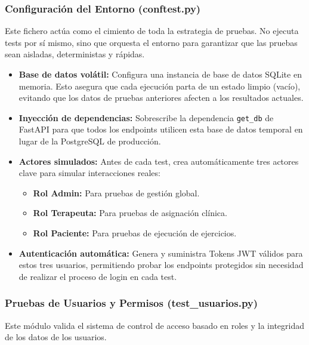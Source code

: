 \subsubsection{Configuración del Entorno (conftest.py)}
Este fichero actúa como el cimiento de toda la estrategia de pruebas. No ejecuta tests por sí mismo, sino que orquesta el entorno para garantizar que las pruebas sean aisladas, deterministas y rápidas.

\begin{itemize}
    \item \textbf{Base de datos volátil:} Configura una instancia de base de datos SQLite en memoria. Esto asegura que cada ejecución parta de un estado limpio (vacío), evitando que los datos de pruebas anteriores afecten a los resultados actuales.
    \item \textbf{Inyección de dependencias:} Sobrescribe la dependencia \texttt{get\_db} de FastAPI para que todos los endpoints utilicen esta base de datos temporal en lugar de la PostgreSQL de producción.
    \item \textbf{Actores simulados:} Antes de cada test, crea automáticamente tres actores clave para simular interacciones reales:
    \begin{itemize}
        \item \textbf{Rol Admin:} Para pruebas de gestión global.
        \item \textbf{Rol Terapeuta:} Para pruebas de asignación clínica.
        \item \textbf{Rol Paciente:} Para pruebas de ejecución de ejercicios.
    \end{itemize}
    \item \textbf{Autenticación automática:} Genera y suministra Tokens JWT válidos para estos tres usuarios, permitiendo probar los endpoints protegidos sin necesidad de realizar el proceso de login en cada test.
\end{itemize}

\subsubsection{Pruebas de Usuarios y Permisos (test\_usuarios.py)}
Este módulo valida el sistema de control de acceso basado en roles y la integridad de los datos de los usuarios.

